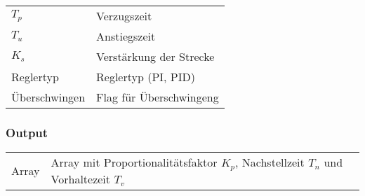 \begin{tabular}{p{40mm}l}
    $ T_p $             & Verzugszeit \\
    $ T_u $             & Anstiegszeit \\
    $ K_s $             & Verst\"arkung der Strecke \\
      Reglertyp         & Reglertyp (PI, PID) \\
    \"Uberschwingen     & Flag f\"ur \"Uberschwingeng
\end{tabular}

\subsubsection*{Output}
\begin{tabular}{p{40mm}l}
    Array & \parbox[t][4em][s]{0.7\textwidth}{Array mit Proportionalit\"atsfaktor $K_p$, Nachstellzeit $T_n$ und Vorhaltezeit $T_v$}
\end{tabular}

